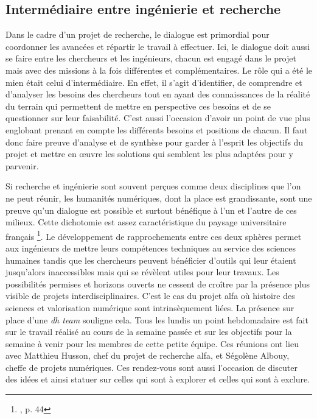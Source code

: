 	\subsection{Intermédiaire entre ingénierie et recherche}
	Dans le cadre d'un projet de recherche, le dialogue est primordial pour coordonner les avancées et répartir le travail à effectuer. Ici, le dialogue doit aussi se faire entre les chercheurs et les ingénieurs, chacun est engagé dans le projet mais avec des missions à la fois différentes et complémentaires. Le rôle qui a été le mien était celui d'intermédiaire. En effet, il s'agit d'identifier, de comprendre et d'analyser les besoins des chercheurs tout en ayant des connaissances de la réalité du terrain qui permettent de mettre en perspective ces besoins et de se questionner sur leur faisabilité. C'est aussi l'occasion d'avoir un point de vue plus englobant prenant en compte les différents besoins et positions de chacun. Il faut donc faire preuve d'analyse et de synthèse pour garder à l'esprit les objectifs du projet et mettre en œuvre les solutions qui semblent les plus adaptées pour y parvenir. 
	
	Si recherche et ingénierie sont souvent perçues comme deux disciplines que l'on ne peut réunir, les humanités numériques, dont la place est grandissante, sont une preuve qu'un dialogue est possible et surtout bénéfique à l'un et l'autre de ces milieux. Cette dichotomie est assez caractéristique du paysage universitaire français \footnote{\cite{foucherAtlasInfluenceFrancaise2013}, p. 44}. Le développement de rapprochements entre ces deux sphères permet aux ingénieurs de mettre leurs compétences techniques au service des sciences humaines tandis que les chercheurs peuvent bénéficier d'outils qui leur étaient jusqu'alors inaccessibles mais qui se révèlent utiles pour leur travaux. Les possibilités permises et horizons ouverts ne cessent de croître par la présence plus visible de projets interdisciplinaires. C'est le cas du projet \acrshort{alfa} où histoire des sciences et valorisation numérique sont intrinsèquement liées. La présence sur place d'une \textit{\acrshort{dh} team} souligne cela. Tous les lundis un point hebdomadaire est fait sur le travail réalisé au cours de la semaine passée et sur les objectifs pour la semaine à venir pour les membres de cette petite équipe. Ces réunions ont lieu avec Matthieu Husson, chef du projet de recherche \acrshort{alfa}, et Ségolène Albouy, cheffe de projets numériques. Ces rendez-vous sont aussi l'occasion de discuter des idées et ainsi statuer sur celles qui sont à explorer et celles qui sont à exclure. 
	
